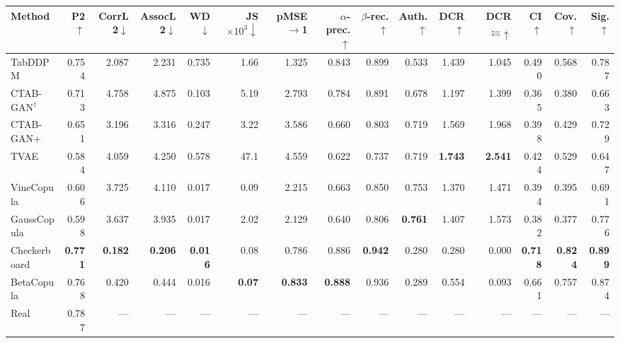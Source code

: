 \begingroup\setlength{\tabcolsep}{2pt}
\begin{tabular}{lrrrrrrrrrrrrrr}
\toprule
Method & P2$\uparrow$ & CorrL2$\downarrow$ & AssocL2$\downarrow$ & WD$\downarrow$ & JS$\times10^{3}\downarrow$ & pMSE$\to$1 & $\alpha$-prec.$\uparrow$ & $\beta$-rec.$\uparrow$ & Auth.$\uparrow$ & DCR$\uparrow$ & DCR$_{5\%}\uparrow$ & CI$\uparrow$ & Cov.$\uparrow$ & Sig.$\uparrow$ \\
\midrule
TabDDPM & 0.754 & 2.087 & 2.231 & 0.735 & 1.66 & 1.325 & 0.843 & 0.899 & 0.533 & 1.439 & 1.045 & 0.490 & 0.568 & 0.787 \\
CTAB-GAN$^{\dagger}$ & 0.713 & 4.758 & 4.875 & 0.103 & 5.19 & 2.793 & 0.784 & 0.891 & 0.678 & 1.197 & 1.399 & 0.365 & 0.380 & 0.663 \\
CTAB-GAN+ & 0.651 & 3.196 & 3.316 & 0.247 & 3.22 & 3.586 & 0.660 & 0.803 & 0.719 & 1.569 & 1.968 & 0.398 & 0.429 & 0.729 \\
TVAE & 0.584 & 4.059 & 4.250 & 0.578 & 47.1 & 4.559 & 0.622 & 0.737 & 0.719 & \textbf{1.743} & \textbf{2.541} & 0.424 & 0.529 & 0.647 \\
VineCopula & 0.606 & 3.725 & 4.110 & 0.017 & 0.09 & 2.215 & 0.663 & 0.850 & 0.753 & 1.370 & 1.471 & 0.394 & 0.395 & 0.691 \\
GaussCopula & 0.598 & 3.637 & 3.935 & 0.017 & 2.02 & 2.129 & 0.640 & 0.806 & \textbf{0.761} & 1.407 & 1.573 & 0.382 & 0.377 & 0.776 \\
Checkerboard & \textbf{0.771} & \textbf{0.182} & \textbf{0.206} & \textbf{0.016} & 0.08 & 0.786 & 0.886 & \textbf{0.942} & 0.280 & 0.280 & 0.000 & \textbf{0.718} & \textbf{0.824} & \textbf{0.899} \\
BetaCopula & 0.768 & 0.420 & 0.444 & 0.016 & \textbf{0.07} & \textbf{0.833} & \textbf{0.888} & 0.936 & 0.289 & 0.554 & 0.093 & 0.661 & 0.757 & 0.874 \\
\midrule
Real & 0.787 & --- & --- & --- & --- & --- & --- & --- & --- & --- & --- & --- & --- & --- \\
\bottomrule
\end{tabular}
\endgroup
